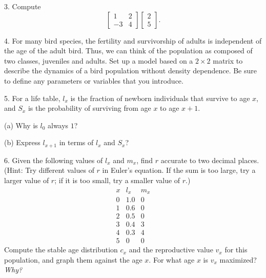 \documentclass[reqno,12pt]{amsart}
\theoremstyle{definition}
\theoremstyle{remark}
\numberwithin{equation}{section}
\begin{document}
3. Compute
$$
\begin{bmatrix}
1 & 2 \\ -3 & 4
\end{bmatrix}
\begin{bmatrix}
2 \\ 5
\end{bmatrix}.
$$

\bigskip

4. For many bird species, the fertility and survivorship of adults
is independent of the age of the adult bird.  Thus, we can think of
the population as composed of two classes, juveniles and adults.
Set up a model based on a $2 \times 2$ matrix to describe the
dynamics of a bird population without density dependence.  Be sure
to define any parameters or variables that you introduce.

\bigskip

5. For a life table, $l_x$ is the fraction of newborn individuals
that survive to age $x$, and $S_x$ is the probability of surviving
from age $x$ to  age $x+1$.

\noindent
(a) Why is $l_0$ always $1$?

\noindent
(b) Express $l_{x+1}$ in terms of $l_x$ and $S_x$?

\bigskip

6. Given the following values of $l_x$ and $m_x$, find $r$ accurate
to two decimal places.  (Hint: Try different values of $r$ in Euler's
equation.  If the sum is too large, try a larger value of $r$; if it
is too small, try a smaller value of $r$.)
$$
\begin{matrix}
x & l_x & m_x \\  \hline
0 & 1.0 & 0   \\
1 & 0.6 & 0   \\
2 & 0.5 & 0   \\
3 & 0.4 & 3   \\
4 & 0.3 & 4   \\
5 &  0  & 0
\end{matrix}
$$
Compute the stable age distribution $c_x$ and the reproductive value
$v_x$ for this population, and graph them against the age $x$.  For
what age $x$ is $v_x$ maximized?  {\it Why?}
\end{document}
